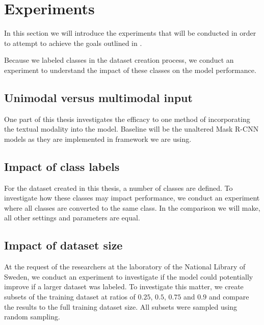 \documentclass[oneside, english, bibtex]{kththesis}
\begin{document}
\clearpage

\section{Experiments}
\label{sec:experiments}

In this section we will introduce the experiments that will be conducted in order to attempt to achieve the goals outlined in .

Because we labeled classes in the dataset creation process, we conduct an experiment to understand the impact of these classes on the model performance.



\subsection{Unimodal versus multimodal input}

One part of this thesis investigates the efficacy to one method of incorporating the textual modality into the model.
Baseline will be the unaltered Mask R-CNN models as they are implemented in framework we are using.

\subsection{Impact of class labels}

For the dataset created in this thesis, a number of classes are defined.
To investigate how these classes may impact performance, we conduct an experiment where all classes are converted to the same class.
In the comparison we will make, all other settings and parameters are equal.

\subsection{Impact of dataset size}

At the request of the researchers at the laboratory of the National Library of Sweden, we conduct an experiment to investigate if the model could potentially improve if a larger dataset was labeled. To investigate this matter, we create subsets of the training dataset at ratios of $0.25$, $0.5$, $0.75$ and $0.9$ and compare the results to the full training dataset size. All subsets were sampled using random sampling.
\end{document}
